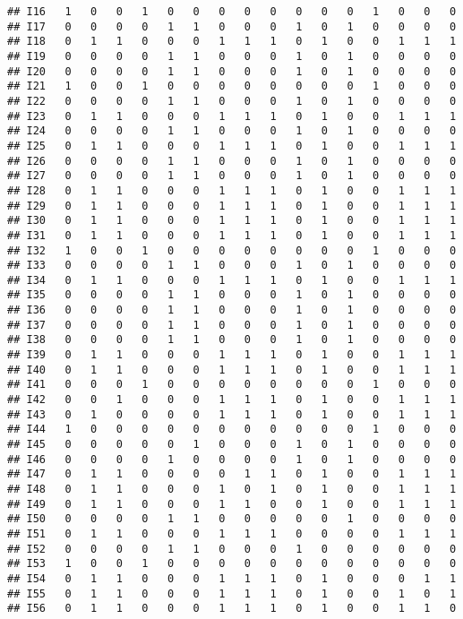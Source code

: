 \documentclass[
]{article}
\begin{document}
\begin{verbatim}
## I16   1   0   0   1   0   0   0   0   0   0   0   0   1   0   0   0
## I17   0   0   0   0   1   1   0   0   0   1   0   1   0   0   0   0
## I18   0   1   1   0   0   0   1   1   1   0   1   0   0   1   1   1
## I19   0   0   0   0   1   1   0   0   0   1   0   1   0   0   0   0
## I20   0   0   0   0   1   1   0   0   0   1   0   1   0   0   0   0
## I21   1   0   0   1   0   0   0   0   0   0   0   0   1   0   0   0
## I22   0   0   0   0   1   1   0   0   0   1   0   1   0   0   0   0
## I23   0   1   1   0   0   0   1   1   1   0   1   0   0   1   1   1
## I24   0   0   0   0   1   1   0   0   0   1   0   1   0   0   0   0
## I25   0   1   1   0   0   0   1   1   1   0   1   0   0   1   1   1
## I26   0   0   0   0   1   1   0   0   0   1   0   1   0   0   0   0
## I27   0   0   0   0   1   1   0   0   0   1   0   1   0   0   0   0
## I28   0   1   1   0   0   0   1   1   1   0   1   0   0   1   1   1
## I29   0   1   1   0   0   0   1   1   1   0   1   0   0   1   1   1
## I30   0   1   1   0   0   0   1   1   1   0   1   0   0   1   1   1
## I31   0   1   1   0   0   0   1   1   1   0   1   0   0   1   1   1
## I32   1   0   0   1   0   0   0   0   0   0   0   0   1   0   0   0
## I33   0   0   0   0   1   1   0   0   0   1   0   1   0   0   0   0
## I34   0   1   1   0   0   0   1   1   1   0   1   0   0   1   1   1
## I35   0   0   0   0   1   1   0   0   0   1   0   1   0   0   0   0
## I36   0   0   0   0   1   1   0   0   0   1   0   1   0   0   0   0
## I37   0   0   0   0   1   1   0   0   0   1   0   1   0   0   0   0
## I38   0   0   0   0   1   1   0   0   0   1   0   1   0   0   0   0
## I39   0   1   1   0   0   0   1   1   1   0   1   0   0   1   1   1
## I40   0   1   1   0   0   0   1   1   1   0   1   0   0   1   1   1
## I41   0   0   0   1   0   0   0   0   0   0   0   0   1   0   0   0
## I42   0   0   1   0   0   0   1   1   1   0   1   0   0   1   1   1
## I43   0   1   0   0   0   0   1   1   1   0   1   0   0   1   1   1
## I44   1   0   0   0   0   0   0   0   0   0   0   0   1   0   0   0
## I45   0   0   0   0   0   1   0   0   0   1   0   1   0   0   0   0
## I46   0   0   0   0   1   0   0   0   0   1   0   1   0   0   0   0
## I47   0   1   1   0   0   0   0   1   1   0   1   0   0   1   1   1
## I48   0   1   1   0   0   0   1   0   1   0   1   0   0   1   1   1
## I49   0   1   1   0   0   0   1   1   0   0   1   0   0   1   1   1
## I50   0   0   0   0   1   1   0   0   0   0   0   1   0   0   0   0
## I51   0   1   1   0   0   0   1   1   1   0   0   0   0   1   1   1
## I52   0   0   0   0   1   1   0   0   0   1   0   0   0   0   0   0
## I53   1   0   0   1   0   0   0   0   0   0   0   0   0   0   0   0
## I54   0   1   1   0   0   0   1   1   1   0   1   0   0   0   1   1
## I55   0   1   1   0   0   0   1   1   1   0   1   0   0   1   0   1
## I56   0   1   1   0   0   0   1   1   1   0   1   0   0   1   1   0
\end{verbatim}
\end{document}
